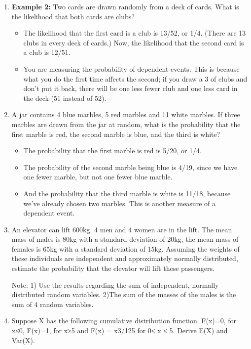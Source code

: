 \documentclass[a4paper,12pt]{article}
\begin{document}
\begin{enumerate}
\item \textbf{Example 2:} Two cards are drawn randomly from a deck of cards. What is the likelihood that both cards are clubs?
\begin{itemize}
\item The likelihood that the first card is a club is 13/52, or 1/4. (There are 13 clubs in every deck of cards.) Now, the likelihood that the second card is a club is 12/51.
\item You are measuring the probability of dependent events. This is because what you do the first time affects the second; if you draw a 3 of clubs and don't put it back, there will be one less fewer club and one less card in the deck (51 instead of 52).
\end{itemize}
\item A jar contains 4 blue marbles, 5 red marbles and 11 white marbles. If three marbles are drawn from the jar at random, what is the probability that the first marble is red, the second marble is blue, and the third is white?
\begin{itemize}
\item The probability that the first marble is red is 5/20, or 1/4. 
\item The probability of the second marble being blue is 4/19, since we have one fewer marble, but not one fewer blue marble. 
\item And the probability that the third marble is white is 11/18, because we've already chosen two marbles. This is another measure of a dependent event.
\end{itemize}

\item  An elevator can lift 600kg. 4 men and 4 women are in the lift. The mean mass of males is 80kg with a standard deviation of 20kg, the mean mass of females is 65kg with a standard deviation of 15kg. Assuming the weights of these individuals are independent and approximately normally distributed, estimate the probability that the elevator will lift these passengers. 

Note: 1) Use the results regarding the sum of independent, normally distributed random variables. 
2)The sum of the masses of the males is the sum of 4 random variables.



\item Suppose X has the following cumulative distribution function. F(x)=0, for x≤0, 
F(x)=1, for x≥5 and F(x) = x3/125 for 0≤ x ≤ 5. Derive E(X) and Var(X).





\end{enumerate}
\end{document}
